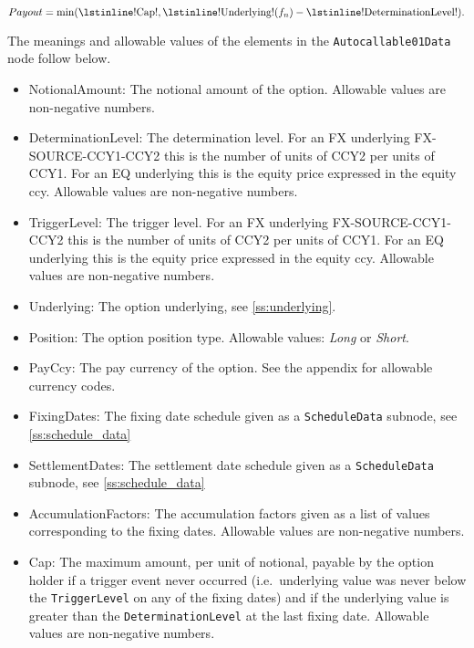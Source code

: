 \begin{equation*}
  Payout = \min (\text{\lstinline!Cap!}, \text{\lstinline!Underlying!}(f_n) - \text{\lstinline!DeterminationLevel!}).
\end{equation*}

The meanings and allowable values of the elements in the \verb+Autocallable01Data+ node follow below.

\begin{itemize}
\item NotionalAmount: The notional amount of the option. Allowable values are non-negative numbers.
\item DeterminationLevel: The determination level. For an FX underlying FX-SOURCE-CCY1-CCY2 this is the number of units
  of CCY2 per units of CCY1. For an EQ underlying this is the equity price expressed in the equity ccy.  Allowable
  values are non-negative numbers.
\item TriggerLevel: The trigger level. For an FX underlying FX-SOURCE-CCY1-CCY2 this is the number of units of CCY2 per
  units of CCY1. For an EQ underlying this is the equity price expressed in the equity ccy.  Allowable values are
  non-negative numbers.
\item Underlying: The option underlying, see \ref{ss:underlying}.
\item Position: The option position type. Allowable values: {\em Long} or {\em Short}.
\item PayCcy: The pay currency of the option. See the appendix for allowable currency codes.
\item FixingDates: The fixing date schedule given as a \verb+ScheduleData+ subnode, see \ref{ss:schedule_data}
\item SettlementDates: The settlement date schedule given as a \verb+ScheduleData+ subnode, see \ref{ss:schedule_data}
\item AccumulationFactors: The accumulation factors given as a list of values corresponding to the fixing
  dates. Allowable values are non-negative numbers.
\item Cap: The maximum amount, per unit of notional, payable by the option holder if a trigger event never occurred
(i.e.\ underlying value was never below the \verb+TriggerLevel+ on any of the fixing dates) and if the underlying value
is greater than the \verb+DeterminationLevel+ at the last fixing date. Allowable values are non-negative numbers.
\end{itemize}
